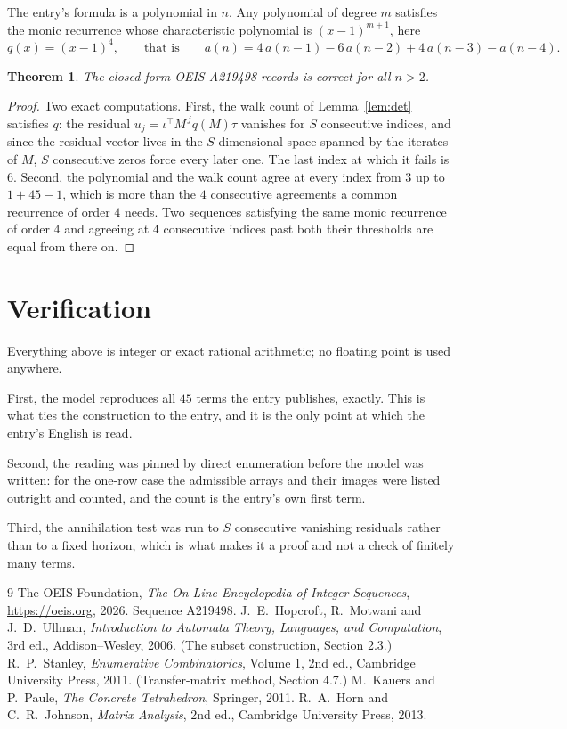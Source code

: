 \documentclass[11pt,a4paper]{article}
\theoremstyle{plain}
\newtheorem{theorem}{Theorem}
\theoremstyle{definition}
\begin{document}
The entry's formula is a polynomial in $n$. Any polynomial of degree $m$ satisfies the monic
recurrence whose characteristic polynomial is $(x-1)^{m+1}$, here
\[
q(x)=(x-1)^{4},\qquad\text{that is}\qquad a(n)=4\,a(n-1) - 6\,a(n-2) + 4\,a(n-3) - a(n-4).
\]

\begin{theorem}
The closed form OEIS A219498 records is correct for all $n>2$.
\end{theorem}

\begin{proof}
Two exact computations. First, the walk count of Lemma~\ref{lem:det} satisfies $q$: the
residual $u_j=\iota^{\!\top}M^{\,j}q(M)\tau$ vanishes for $S$ consecutive indices, and
since the residual vector lives in the $S$-dimensional space spanned by the iterates of $M$,
$S$ consecutive zeros force every later one. The last index at which it fails is $6$.
Second, the polynomial and the walk count agree at every index from $3$ up to
$1 + 45 - 1$, which is more than the $4$ consecutive agreements a
common recurrence of order $4$ needs. Two sequences satisfying the same monic recurrence
of order $4$ and agreeing at $4$ consecutive indices past both their thresholds are
equal from there on.
\end{proof}

\section{Verification}

Everything above is integer or exact rational arithmetic; no floating point is used anywhere.

First, the model reproduces all $45$ terms the entry publishes, exactly. This is what
ties the construction to the entry, and it is the only point at which the entry's English is
read.

Second, the reading was pinned by direct enumeration before the model was written: for the
one-row case the admissible arrays and their images were listed outright and counted, and the
count is the entry's own first term.

Third, the annihilation test was run to $S$ consecutive vanishing residuals rather than to a
fixed horizon, which is what makes it a proof and not a check of finitely many terms.

\begin{thebibliography}{9}
 The OEIS Foundation, \emph{The On-Line Encyclopedia of Integer
Sequences}, \url{https://oeis.org}, 2026. Sequence A219498.
 J.~E.~Hopcroft, R.~Motwani and J.~D.~Ullman, \emph{Introduction to Automata
Theory, Languages, and Computation}, 3rd ed., Addison--Wesley, 2006. (The subset
construction, Section 2.3.)
 R.~P.~Stanley, \emph{Enumerative Combinatorics}, Volume 1, 2nd ed.,
Cambridge University Press, 2011. (Transfer-matrix method, Section 4.7.)
 M.~Kauers and P.~Paule, \emph{The Concrete Tetrahedron}, Springer, 2011.
 R.~A.~Horn and C.~R.~Johnson, \emph{Matrix Analysis}, 2nd ed., Cambridge
University Press, 2013.
\end{thebibliography}
\end{document}
